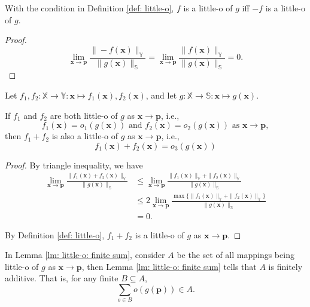 \begin{lemma}
	\label{lm: little-o: negative}
	With the condition in Definition \ref{def: little-o}, $f$ is a little-o of $g$ iff $-f$ is a little-o of $g$.
	
	\begin{proof}
		$$
		\lim_{\mathbf x \to \mathbf p} \frac{\| - f(\mathbf x) \|_{\mathbb Y}}{\| g(\mathbf x) \|_{\mathbb S}} = \lim_{\mathbf x \to \mathbf p} \frac{\| f(\mathbf x) \|_{\mathbb Y}}{\| g(\mathbf x) \|_{\mathbb S}} = 0.
		$$
	\end{proof}
\end{lemma}


\begin{lemma}
	\label{lm: little-o: finite sum}
	Let $f_1, f_2: \mathbb X \to \mathbb Y: \mathbf x \mapsto f_1(\mathbf x), f_2(\mathbf x)$, and let $g: \mathbb X \to \mathbb S: \mathbf x \mapsto g(\mathbf x)$.
	
	If $f_1$ and $f_2$ are both little-o of $g$ as $\mathbf x \to \mathbf p$, i.e.,
	$$
	f_1(\mathbf x) = o_1(g(\mathbf x)) \text{ and } f_2(\mathbf x) = o_2(g(\mathbf x)) \text{ as $\mathbf x \to \mathbf p$},
	$$
	then $f_1 + f_2$ is also a little-o of $g$ as $\mathbf x \to \mathbf p$, i.e.,
	$$
	f_1(\mathbf x) + f_2(\mathbf x) = o_3(g(\mathbf x))
	$$
	
	\begin{proof}
		By triangle inequality,  we have
		$$
		\begin{aligned}
			\lim_{\mathbf x \to \mathbf p}\frac{\| f_1(\mathbf x) + f_2(\mathbf x) \|_{\mathbb Y}}{\| g(\mathbf x) \|_{\mathbb S} } &\le \lim_{\mathbf x \to \mathbf p} \frac{\| f_1(\mathbf x) \|_{\mathbb Y} + \| f_2(\mathbf x) \|_{\mathbb Y}}{\| g(\mathbf x) \|_{\mathbb S}} \\
			&\le 2 \lim_{\mathbf x \to \mathbf p} \frac{\max\{ \| f_1(\mathbf x) \|_{\mathbb Y} + \| f_2(\mathbf x) \|_{\mathbb Y} \}}{\| g(\mathbf x) \|_{\mathbb S}} \\
			&= 0.
		\end{aligned}
		$$
		
		By Definition \ref{def: little-o}, $f_1 + f_2$ is a little-o of $g$ as $\mathbf x \to \mathbf p$.
	\end{proof}
\end{lemma}



\begin{note}
	In Lemma \ref{lm: little-o: finite sum}, consider $A$ be the set of all mappings being little-o of $g$ as $\mathbf x \to \mathbf p$, then Lemma \ref{lm: little-o: finite sum} tells that $A$ is finitely additive. That is, for any finite $B \subseteq A$,
	$$
	\sum_{o \in B} o(g(\mathbf p)) \in A.
	$$
\end{note}




